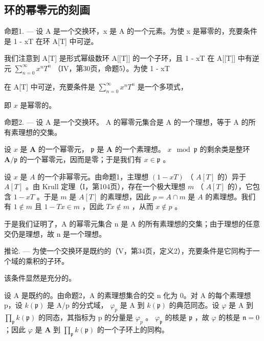 \subsection{环的幂零元的刻画}

命题1. --- 设 A 是一个交换环，x 是 A 的一个元素。为使 x 是幂零的，充要条件是 1 - xT 在环 A{[}T{]} 中可逆。

我们注意到 A{[}T{]} 是形式幂级数环 A{[}{[}T{]}{]} 的一个子环，且 1 - xT 在 A{[}{[}T{]}{]} 中有逆元 \(\sum_{n=0}^{\infty} x^{n} T^{n}\) （IV，第30页，命题5）。为使 1 - xT

在 A{[}T{]} 中可逆，充要条件是 \(\sum_{n=0}^{\infty} x^n T^n\) 是一个多项式，

即 \(x\) 是幂零的。

命题2. --- 设 A 是一个交换环。 A 的幂零元集合是 A 的一个理想，等于 A 的所有素理想的交集。

设 \(x\) 是 \(\mathbf{A}\) 的一个幂零元， \(\mathfrak{p}\) 是 \(\mathbf{A}\) 的一个素理想。 \(x \mod \mathfrak{p}\) 的剩余类是整环 \(\mathbf{A} / \mathfrak{p}\) 的一个幂零元，因而是零；于是我们有 \(x \in \mathfrak{p}\) 。

设 \(x\) 是 \(A\) 的一个非幂零元。由命题1，主理想 \((1 - xT)\) （ \(A[T]\) 的）异于 \(A[T]\) 。由 Krull 定理（I，第104页），存在一个极大理想 \(m\) （ \(A[T]\) 的），它包含 \(1 - xT\) 。于是 \(m\) 是 \(A[T]\) 的素理想，因此 \(p = A \cap m\) 是 \(A\) 的素理想。我们有 \(1 \notin m\) 且 \(1 - Tx \in m\) ，因此 \(Tx \notin m\) ，从而 \(x \notin p\) 。

于是我们证明了，A 的幂零元集合 n 是 A 的所有素理想的交集；由于理想的任意交仍是理想，故 n 是一个理想。

推论. --- 为使一个交换环是既约的（V，第34页，定义2），充要条件是它同构于一个域的乘积的子环。

该条件显然是充分的。

设 A 是既约的。由命题2，A 的素理想集合的交 n 化为 0。对 A 的每个素理想 p，设 \(k(\mathfrak{p})\) 是 A/p 的分式域， \(\varphi_{p}\) 是 A 到 \(k(\mathfrak{p})\) 的典范同态。设 \(\varphi\) 是 A 到 \(\prod_{\mathfrak{p}} k(\mathfrak{p})\) 的同态，其指标为 p 的分量是 \(\varphi_{p}\) 。 \(\varphi_{\mathfrak{p}}\) 的核是 \(\mathfrak{p}\) ，故 \(\varphi\) 的核是 \(\mathfrak{n} = 0\) ；因此 \(\varphi\) 是 \(\mathbf{A}\) 到 \(\prod_{\mathfrak{p}} k(\mathfrak{p})\) 的一个子环上的同构。

